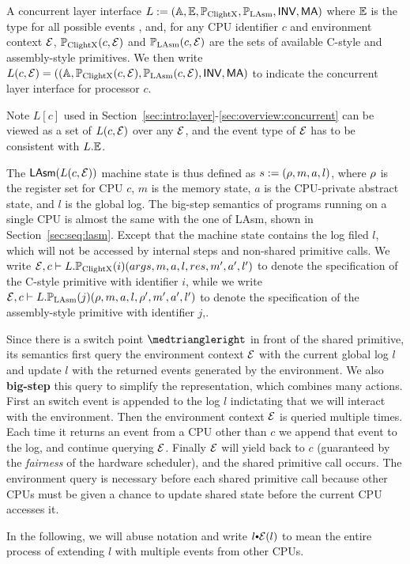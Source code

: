 \begin{definition}
A concurrent layer interface $L :=(\mathbb{A}, \mathbb{E}, \mathbb{P}_{\mathrm{ClightX}}, \mathbb{P}_{\mathrm{LAsm}}, \textsf{INV}, \textsf{MA})$ where 
$\mathbb{E}$ is the type for all possible events
, and, for any CPU identifier $c$ and environment 
context $\mathcal{E}$, $\mathbb{P}_{\mathrm{ClightX}}(c, \mathcal{E})$ 
and $\mathbb{P}_{\mathrm{LAsm}}(c, \mathcal{E})$ are the sets of 
available C-style and assembly-style primitives. We then write $L(c, \mathcal{E}) = ((\mathbb{A}, \mathbb{P}_{\mathrm{ClightX}}(c, \mathcal{E}), \mathbb{P}_{\mathrm{LAsm}}(c, \mathcal{E}), \textsf{INV}, \textsf{MA})$ to indicate the 
concurrent layer interface for processor $c$.
\end{definition}%
\noindent
Note $L[c]$ used in Section~\ref{sec:intro:layer}-\ref{sec:overview:concurrent}
can be viewed as a set of $L(c,\mathcal{E})$ over any $\mathcal{E}$,
and the event type of $\mathcal{E}$ has to be consistent
with $L.\mathbb{E}$.

The $\mathsf{LAsm}(L(c, \mathcal{E}))$ machine state is thus defined as $s:=(\rho, m, a, l)$,
where $\rho$ is the register set for CPU $c$,
$m$ is the memory state,
$a$ is the CPU-private abstract state,
and $l$ is the global log.
The big-step semantics of programs running on a single CPU is
almost the same with the one of LAsm,
shown in Section~\ref{sec:seq:lasm}.
Except that the machine state contains the log filed $l$,
which will not be accessed by internal steps
and non-shared primitive calls.
We write $\mathcal{E}, c \vdash L.\mathbb{P}_{\mathrm{ClightX}}(i) (args,m, a, l,res,m',a',l')$ to denote
the specification of the C-style primitive
with identifier $i$,
while we write $\mathcal{E}, c \vdash L.\mathbb{P}_{\mathrm{LAsm}}(j) (\rho,m, a, l,\rho',m',a',l')$ to denote
the specification of the assembly-style primitive with identifier $j$,.

Since there is a switch point $\intp$ 
in front of the shared primitive,
its semantics first query the environment context $\mathcal{E}$
with the current global log $l$
and update $l$ with the returned events generated by the environment.
We also \textbf{big-step} this query to simplify the representation,
which combines many actions.
First an switch event is
appended to the log $l$ indictating that we will interact with the
environment. Then the environment context $\mathcal{E}$ is queried
multiple times. Each time it returns an event from a CPU other than
$c$ we append that event to the log, and continue querying
$\mathcal{E}$. Finally $\mathcal{E}$ will yield back to $c$
(guaranteed by the \emph{fairness} of the hardware scheduler), and
the shared primitive call occurs.
The environment query is necessary before each shared primitive call because 
other CPUs must be given a chance to update shared state before the current 
CPU accesses it. 
 In the following, we will abuse notation and write
$l \cons \oracle(l)$ to mean the entire process of extending $l$ with
multiple events from other CPUs.

